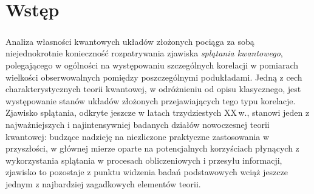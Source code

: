 
\chapter{Wstęp}
\label{chp:intro}

\paragraph{}
\label{par:intro:01}
Analiza własności kwantowych układów złożonych pociąga za sobą niejednokrotnie
konieczność rozpatrywania zjawiska
 \emph{splątania kwantowego},
polegającego w ogólności na występowaniu szczególnych korelacji w pomiarach 
wielkości obserwowalnych pomiędzy poszczególnymi podukładami. 
Jedną z cech charakterystycznych teorii kwantowej,
w odróżnieniu od opisu klasycznego,
jest występowanie stanów układów złożonych przejawiających tego typu korelacje.
Zjawisko splątania, odkryte jeszcze w latach trzydziestych XX\,w.,
stanowi jeden z najważniejszych i najintensywniej badanych działów nowoczesnej
teorii kwantowej:
budzące nadzieję na niezliczone praktyczne zastosowania w przyszłości,
w głównej mierze oparte na potencjalnych korzyściach płynących
z wykorzystania splątania w procesach obliczeniowych i przesyłu informacji,
zjawisko to pozostaje z punktu widzenia badań podstawowych wciąż jeszcze jednym
z najbardziej zagadkowych elementów teorii.

